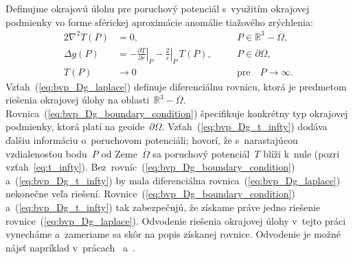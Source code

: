 \documentclass[a4paper, 12pt]{book}
\begin{document}
Definujme okrajovú úlohu pre poruchový potenciál s~využitím okrajovej podmienky 
vo forme sférickej aproximácie anomálie tiažového zrýchlenia:
%
\begin{alignat}{2}
\nabla^2 T(P) &= 0{,} &&P \in \mathbb{R}^3 
- \overline\Omega{,}\label{eq:bvp_Dg_laplace}\\
\Delta g(P) &= -\left.\frac{\partial T}{\partial r}\right|_P 
- \left.\frac{2}{r}\right|_P \, T(P){,} \quad &&P \in 
\partial\Omega{,}\label{eq:bvp_Dg_boundary_condition}\\
T(P) &\rightarrow 0 &&\textrm{pre} \quad P \rightarrow 
\infty{.}\label{eq:bvp_Dg_t_infty}
\end{alignat}
%
Vzťah~(\ref{eq:bvp_Dg_laplace}) definuje diferenciálnu rovnicu, ktorá je 
predmetom riešenia okrajovej úlohy na oblasti~$\mathbb{R}^3 - \overline\Omega$.  
Rovnica~(\ref{eq:bvp_Dg_boundary_condition}) špecifikuje konkrétny typ 
okrajovej podmienky, ktorá platí na geoide~$\partial\Omega$.  
Vzťah~(\ref{eq:bvp_Dg_t_infty}) dodáva ďalšiu informáciu o~poruchovom 
potenciáli; hovorí, že s~narastajúcou vzdialenosťou bodu~$P$ od 
Zeme~$\overline\Omega$ sa poruchový potenciál~$T$ blíži k~nule (pozri 
vzťah~\ref{eq:t_infty}).  Bez~rovníc~(\ref{eq:bvp_Dg_boundary_condition}) 
a~(\ref{eq:bvp_Dg_t_infty}) by mala diferenciálna 
rovnica~(\ref{eq:bvp_Dg_laplace}) nekonečne veľa riešení.  
Rovnice~(\ref{eq:bvp_Dg_boundary_condition}) a~(\ref{eq:bvp_Dg_t_infty}) tak 
zabezpečujú, že získame práve jedno riešenie rovnice~(\ref{eq:bvp_Dg_laplace}).  
Odvodenie riešenia okrajovej úlohy v~tejto práci vynecháme a~zameriame sa skôr 
na popis získanej rovnice.  Odvodenie je možné nájsť napríklad 
v~prácach~\textcite{MoritzPhysicalGeodesy} a~\textcite{Janak2006}.
\end{document}
